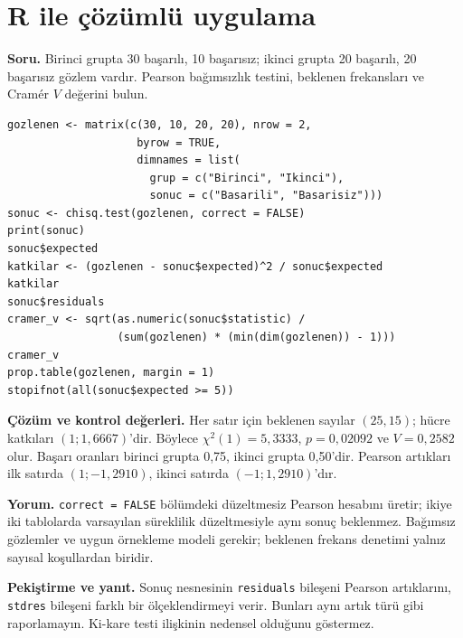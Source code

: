 \section{R ile çözümlü uygulama}
\label{sec:r-b12}

\textbf{Soru.} Birinci grupta 30 başarılı, 10 başarısız; ikinci grupta
20 başarılı, 20 başarısız gözlem vardır. Pearson bağımsızlık testini,
beklenen frekansları ve Cramér $V$ değerini bulun.

\begin{lstlisting}[style=prismR]
gozlenen <- matrix(c(30, 10, 20, 20), nrow = 2,
                    byrow = TRUE,
                    dimnames = list(
                      grup = c("Birinci", "Ikinci"),
                      sonuc = c("Basarili", "Basarisiz")))
sonuc <- chisq.test(gozlenen, correct = FALSE)
print(sonuc)
sonuc$expected
katkilar <- (gozlenen - sonuc$expected)^2 / sonuc$expected
katkilar
sonuc$residuals
cramer_v <- sqrt(as.numeric(sonuc$statistic) /
                 (sum(gozlenen) * (min(dim(gozlenen)) - 1)))
cramer_v
prop.table(gozlenen, margin = 1)
stopifnot(all(sonuc$expected >= 5))
\end{lstlisting}

\begin{outputguidebox}
\textbf{Çözüm ve kontrol değerleri.} Her satır için beklenen sayılar
$(25,15)$; hücre katkıları $(1;1{,}6667)$'dir. Böylece
$\chi^2(1)=5{,}3333$, $p=0{,}02092$ ve $V=0{,}2582$ olur. Başarı oranları
birinci grupta 0,75, ikinci grupta 0,50'dir. Pearson artıkları ilk satırda
$(1;-1{,}2910)$, ikinci satırda $(-1;1{,}2910)$'dır.
\end{outputguidebox}

\textbf{Yorum.} \texttt{correct = FALSE} bölümdeki düzeltmesiz Pearson
hesabını üretir; ikiye iki tablolarda varsayılan süreklilik düzeltmesiyle aynı
sonuç beklenmez. Bağımsız gözlemler ve uygun örnekleme modeli gerekir;
beklenen frekans denetimi yalnız sayısal koşullardan biridir.

\textbf{Pekiştirme ve yanıt.} Sonuç nesnesinin \texttt{residuals} bileşeni
Pearson artıklarını, \texttt{stdres} bileşeni farklı bir ölçeklendirmeyi verir. Bunları aynı
artık türü gibi raporlamayın. Ki-kare testi ilişkinin nedensel olduğunu göstermez.